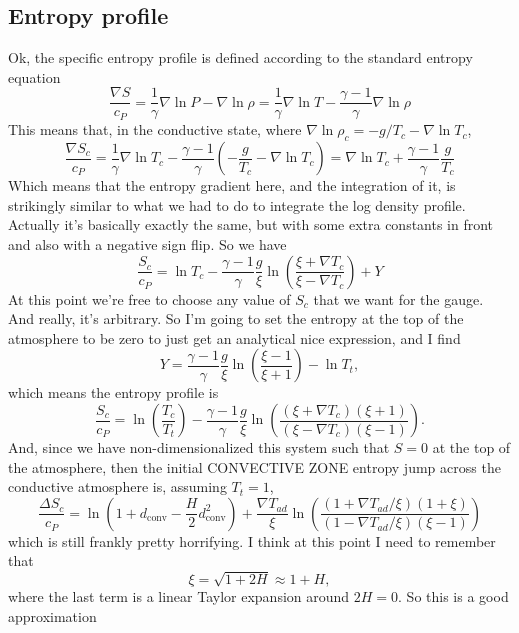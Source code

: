 \documentclass[aps, pre, onecolumn, nofootinbib, notitlepage, groupedaddress, amsfonts, amssymb, amsmath, longbibliography]{revtex4-1}
\newcommand{\grad}{\ensuremath{\nabla}}
\begin{document}
\subsection{Entropy profile}
Ok, the specific entropy profile is defined according to the standard entropy equation
\begin{equation}
\frac{\grad S}{c_P} = \frac{1}{\gamma}\grad\ln P - \grad \ln \rho = \frac{1}{\gamma}\grad\ln T - \frac{\gamma - 1}{\gamma} \grad\ln\rho
\end{equation}
This means that, in the conductive state, where $\grad \ln \rho_c = -g/T_c - \grad\ln T_c$,
$$
\frac{\grad S_c}{c_P} = \frac{1}{\gamma}\grad\ln T_c - \frac{\gamma-1}{\gamma}\left(-\frac{g}{T_c} - \grad\ln T_c\right)
= \grad\ln T_c + \frac{\gamma - 1}{\gamma}\frac{g}{T_c}
$$
Which means that the entropy gradient here, and the integration of it, is strikingly similar to
what we had to do to integrate the log density profile.  Actually it's basically exactly the same, but with
some extra constants in front and also with a negative sign flip.  So we have
$$
\frac{S_c}{c_P} = \ln T_c - \frac{\gamma-1}{\gamma}\frac{g}{\xi}\ln\left(\frac{\xi + \grad T_c}{\xi - \grad T_c}\right) + Y
$$
At this point we're free to choose any value of $S_c$ that we want for the gauge.  And really, it's arbitrary.  So I'm
going to set the entropy at the top of the atmosphere to be zero to just get an analytical nice expression, and I find
$$
Y = \frac{\gamma - 1}{\gamma} \frac{g}{\xi} \ln \left(\frac{\xi - 1}{\xi + 1}\right) - \ln T_t,
$$
which means the entropy profile is
\begin{equation}
\boxed{
\frac{S_c}{c_P} = \ln\left(\frac{T_c}{T_t}\right) 
- \frac{\gamma-1}{\gamma}\frac{g}{\xi}\ln\left(\frac{(\xi + \grad T_c)(\xi + 1)}{(\xi - \grad T_c)(\xi - 1)}\right)}.
\end{equation}
And, since we have non-dimensionalized this system such that $S = 0$ at the top of the atmosphere,
then the initial CONVECTIVE ZONE entropy jump across the conductive atmosphere is, assuming
$T_t = 1$,
\begin{equation}
\frac{\Delta S_c}{c_P} = \ln\left(1 + d_{\text{conv}} - \frac{H}{2} d_{\text{conv}}^2\right)
+ \frac{\grad T_{ad}}{\xi}\ln\left(\frac{(1 + \grad T_{ad}/\xi) (1 + \xi)}{(1 - \grad T_{ad}/\xi)(\xi - 1)}\right)
\end{equation}
which is still frankly pretty horrifying.  I think at this point I need to remember that
$$
\xi = \sqrt{1 + 2H} \approx 1 + H,
$$
where the last term is a linear Taylor expansion around $2H = 0$.  So this is a good approximation
\end{document}
